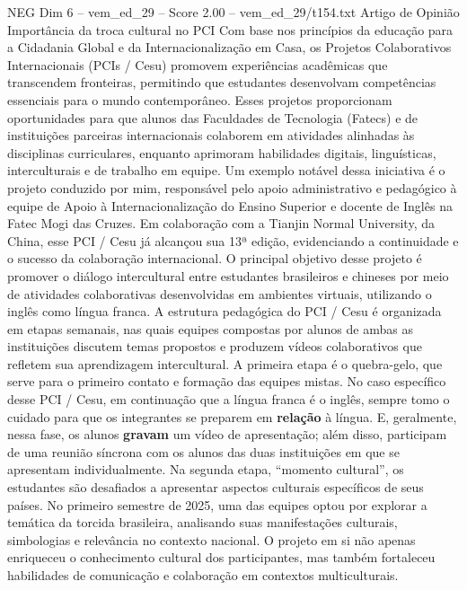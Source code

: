 \begin{textsample}{NEG Dim 6 – vem\_ed\_29 – Score 2.00 – vem\_ed\_29/t154.txt}  \label{ex:f6_neg_158}
Artigo de Opinião Importância da troca cultural no PCI Com base nos princípios da educação para a Cidadania Global e da Internacionalização em Casa, os Projetos Colaborativos Internacionais (PCIs / Cesu) promovem experiências acadêmicas que transcendem fronteiras, permitindo que estudantes desenvolvam competências essenciais para o mundo contemporâneo.
Esses projetos proporcionam oportunidades para que alunos das Faculdades de Tecnologia (Fatecs) e de instituições parceiras internacionais colaborem em atividades alinhadas às disciplinas curriculares, enquanto aprimoram habilidades digitais, linguísticas, interculturais e de trabalho em equipe.
Um exemplo notável dessa iniciativa é o projeto conduzido por mim, responsável pelo apoio administrativo e pedagógico à equipe de Apoio à Internacionalização do Ensino Superior e docente de Inglês na Fatec Mogi das Cruzes.
Em colaboração com a Tianjin Normal University, da China, esse PCI / Cesu já alcançou sua 13ª edição, evidenciando a continuidade e o sucesso da colaboração internacional.
O principal objetivo desse projeto é promover o diálogo intercultural entre estudantes brasileiros e chineses por meio de atividades colaborativas desenvolvidas em ambientes virtuais, utilizando o inglês como língua franca.
A estrutura pedagógica do PCI / Cesu é organizada em etapas semanais, nas quais equipes compostas por alunos de ambas as instituições discutem temas propostos e produzem vídeos colaborativos que refletem sua aprendizagem intercultural.
A primeira etapa é o quebra-gelo, que serve para o primeiro contato e formação das equipes mistas.
No caso específico desse PCI / Cesu, em continuação que a língua franca é o inglês, sempre tomo o cuidado para que os integrantes se preparem em \textbf{relação} à língua.
E, geralmente, nessa fase, os alunos \textbf{gravam} um vídeo de apresentação; além disso, participam de uma reunião síncrona com os alunos das duas instituições em que se apresentam individualmente.
Na segunda etapa, “momento cultural”, os estudantes são desafiados a apresentar aspectos culturais específicos de seus países.
No primeiro semestre de 2025, uma das equipes optou por explorar a temática da torcida brasileira, analisando suas manifestações culturais, simbologias e relevância no contexto nacional.
O projeto em si não apenas enriqueceu o conhecimento cultural dos participantes, mas também fortaleceu habilidades de comunicação e colaboração em contextos multiculturais.

\end{textsample}
